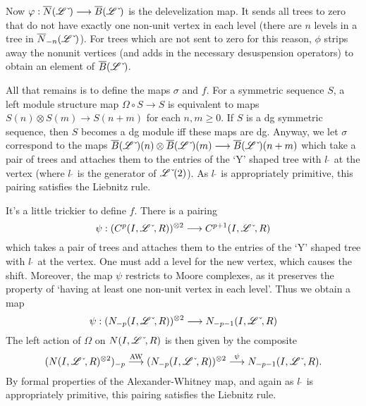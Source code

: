 \documentclass[10pt]{article}
\newcommand{\dual}{\,\check{\,}}
\newcommand{\LieOperad}{\scrL}
\newcommand{\dualLieOperad}{\LieOperad\dual}
\begin{document}
\begin{PRlieKoszulComplexCalculation}
Now $\phi:\overline{N}(\dualLieOperad)\to \overline{B}(\dualLieOperad)$ is the delevelization map. It sends all trees to zero that do not have exactly one non-unit vertex in each level (there are $n$ levels in a tree in $\overline{N}_{-n}(\dualLieOperad)$). For trees which are not sent to zero for this reason, $\phi$ strips away the nonunit vertices (and adds in the necessary desuspension operators) to obtain an element of $\overline{B}(\dualLieOperad)$.

All that remains is to define the maps $\sigma$ and $f$. For a symmetric sequence $S$, a left module structure map $\Omega\circ S\to S$ is equivalent to maps $S(n)\otimes S(m)\to S(n+m)$ for each $n,m\geq0$. If $S$ is a dg symmetric sequence, then $S$ becomes a dg module iff these maps are dg. Anyway, we let $\sigma$ correspond to the maps $\overline{B}(\dualLieOperad)(n)\otimes \overline{B}(\dualLieOperad)(m)\to \overline{B}(\dualLieOperad)(n+m)$ which take a pair of trees and attaches them to the entries of the `Y' shaped tree with $l\dual$ at the vertex (where $l\dual$ is the generator of $\dualLieOperad(2)$). As $l\dual$ is appropriately primitive, this pairing satisfies the Liebnitz rule.

It's a little trickier to define $f$. 
There is a pairing
\[\psi:(C^p(I,\dualLieOperad,R))^{\otimes 2}\to C^{p+1}(I,\dualLieOperad,R)\]
which takes a pair of trees and attaches them to the entries of the `Y' shaped tree with $l\dual$ at the vertex. One must add a level for the new vertex, which causes the shift. Moreover, the map $\psi$ restricts to Moore complexes, as it preserves the property of `having at least one non-unit vertex in each level'. Thus we obtain a map
\[\psi:(N_{-p}(I,\dualLieOperad,R))^{\otimes 2}\to N_{-p-1}(I,\dualLieOperad,R)\]
 The left action of $\Omega$ on $N(I,\dualLieOperad,R)$ is then given by the composite
\[(N(I,\dualLieOperad,R)^{\otimes 2})_{-p}\overset{\textup{AW}}{\to} (N_{-p}(I,\dualLieOperad,R))^{\otimes 2}\overset{\psi}{\to}N_{-p-1}(I,\dualLieOperad,R).\]
By formal properties of the Alexander-Whitney map, and again as $l\dual$ is appropriately primitive, this pairing satisfies the Liebnitz rule.


\end{PRlieKoszulComplexCalculation}
\end{document}
